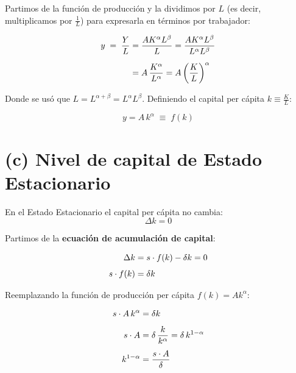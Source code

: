 \documentclass[11pt,a4paper]{article}
\begin{document}
Partimos de la función de producción y la dividimos por $L$ (es decir, multiplicamos por $\tfrac{1}{L}$) para expresarla en términos por trabajador:

\begin{align}
    y \;=\; \frac{Y}{L} &= \frac{A K^{\alpha} L^{\beta}}{L} = \frac{A K^{\alpha} L^{\beta}}{L^{\alpha} L^{\beta}} \notag \\[6pt]
    &= A \, \frac{K^{\alpha}}{L^{\alpha}} = A \left(\frac{K}{L}\right)^{\alpha}
\end{align}

Donde se usó que $L = L^{\alpha + \beta} = L^{\alpha} L^{\beta}$. Definiendo el capital per cápita $k \equiv \tfrac{K}{L}$:

\begin{resultadobox}
\begin{equation}
    y = A \, k^{\alpha} \;\equiv\; f(k)
\end{equation}
\end{resultadobox}

\section{(c) Nivel de capital de Estado Estacionario}

\begin{definicionbox}
En el Estado Estacionario el capital per cápita no cambia:
\[
\Delta k = 0
\]
\end{definicionbox}

Partimos de la \textbf{ecuación de acumulación de capital}:

\begin{align}
    \Delta k &= s \cdot f(k) - \delta k = 0 \notag \\[4pt]
    s \cdot f(k) &= \delta k
\end{align}

Reemplazando la función de producción per cápita $f(k) = A k^{\alpha}$:

\begin{align}
    s \cdot A \, k^{\alpha} &= \delta k \notag \\[4pt]
    s \cdot A &= \delta \, \frac{k}{k^{\alpha}} = \delta \, k^{1-\alpha} \notag \\[4pt]
    k^{1-\alpha} &= \frac{s \cdot A}{\delta}
\end{align}
\end{document}
